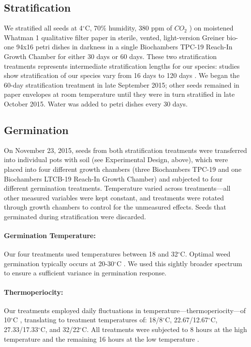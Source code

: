 \documentclass[12pt]{article}\usepackage[]{graphicx}\usepackage[]{color}
\begin{document}
	\subsection{Stratification} 
	We stratified all seeds at 4$^\circ$C, 70\% humidity, 380 ppm of $CO_2$ \parencite[e.g.,][]{Meekins1999,Popay1970}) on moistened Whatman 1 qualitative filter paper in sterile, vented, light-version Greiner bio-one 94x16 petri dishes in darkness \parencite{Baskin1998,Popay1970} in a single Biochambers TPC-19 Reach-In Growth Chamber for either 30 days or 60 days. These two stratification treatments represents intermediate stratification lengths for our species: studies show stratification of our species vary from 16 days \parencite{Popay1970} to 120 days \parencite{Meekins1999}. We began the 60-day stratification treatment in late September 2015; other seeds remained in paper envelopes at room temperature until they were in turn stratified in late October 2015.  Water was added to petri dishes every 30 days.
	
	\subsection{Germination }
	On November 23, 2015, seeds from both stratification treatments were transferred into individual pots with soil (see Experimental Design, above), which were placed into four different growth chambers (three Biochambers TPC-19 and one Biochambers LTCB-19 Reach-In Growth Chamber) and subjected to four different germination treatments. Temperature varied across treatments---all other measured variables were kept constant, and treatments were rotated through growth chambers to control for the unmeasured effects. Seeds that germinated during stratification were discarded.
	
	\paragraph{Germination Temperature:} Our four treatments used temperatures between 18 and 32$^\circ$C. Optimal weed germination typically occurs at 20-30$^\circ$C \parencite{Hartmann2010,Steinbauer1957,Wulff1994,Popay1970}. We used this  sightly broader spectrum to ensure a sufficient variance in germination response.
	
	\paragraph{Thermoperiocity:} Our treatments employed daily fluctuations in temperature---thermoperiocity---of 10$^\circ$C \parencite[see e.g.,][]{Steinbauer1957, Toole1963,ISTA1954}, translating to treatment temperatures of: 18/8$^\circ$C, 22.67/12.67$^\circ$C, 27.33/17.33$^\circ$C, and 32/22$^\circ$C. All treatments were subjected to 8 hours at the high temperature and the remaining 16 hours at the low temperature \parencite{Baskin1998,Roberts1981,Popay1970,Probert2000}. %
\end{document}
